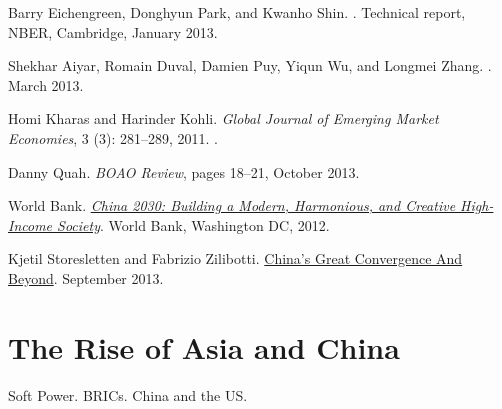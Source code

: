 \documentclass[%
 11pt%
]{article}
\begin{document}
\bigskip

Barry Eichengreen, Donghyun Park, and Kwanho Shin.
.
\newblock Technical report, NBER, Cambridge, January 2013.
\medskip

Shekhar Aiyar, Romain Duval, Damien Puy, Yiqun Wu, and Longmei Zhang.
.
\newblock March 2013.
\medskip

Homi Kharas and Harinder Kohli.
\newblock \emph{Global Journal of Emerging Market Economies}, 3
  (3): 281--289, 2011.
.
\medskip

Danny Quah.
\newblock \emph{BOAO Review}, pages 18--21, October
2013.%
\medskip

{World Bank}.
\newblock \href{http://www.worldbank.org/content/dam/Worldbank/document/China-2030-complete.pdf}{\emph{{China 2030: Building a Modern, Harmonious, and Creative
  High-Income Society}}}.
\newblock World Bank, Washington DC, 2012.
\medskip

Kjetil Storesletten and Fabrizio Zilibotti.
\newblock \href{http://www.cepr.org/sites/default/files/ZILIBOTTI -
  China\_great\_convergence\_and\_beyond\_2013\_09\_20.pdf}{China's Great Convergence And Beyond}.
\newblock September 2013.
\medskip

\section{The Rise of Asia and China}

Soft Power.
BRICs.
China and the US.

\nocite{Buzan-B+Cox-M-China-US-Power-Shifts-2013}
\nocite{Nye-J-Future-of-Power-2011}
\nocite{Li-Eric-A-Tale-Two-Political-Systems-2013}
\nocite{Subramanian-A-Eclipse-2011}
\nocite{Huang-Y-Understanding-Chinas-Unbalanced-Growth-2013}
\nocite{Unz-R-Chinas-Rise-Americas-Fall-2012}
\end{document}
